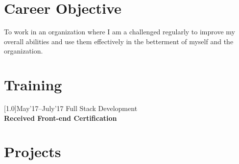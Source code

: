 \documentclass[english]{cv-style}     %
\begin{document}
\vspace{0.2cm}
\section{Career Objective}
  \vspace{-0.2cm}
To work in an organization where I am a challenged regularly to improve my overall abilities and use them effectively in
the betterment of myself and the organization.
\section{Training}
\begin{entrylist}

\entry
  {\scalebox{.8}[1.0]{May'17--July'17}}
  {Full Stack Development}
  {}
  {\\
 	\textbf{Received Front-end Certification}
  }
\end{entrylist}
\section{Projects}
  \vspace{-0.2cm}
  
\end{document}
